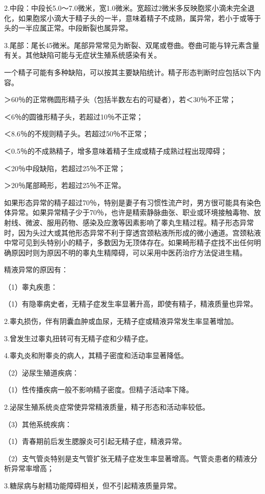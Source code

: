 \documentclass[12pt,UTF8,openany]{ctexbook}
\begin{document}
2.中段：中段长5.0～7.0微米，宽1.0微米。宽超过2微米多反映胞浆小滴未完全退化，如果胞浆小滴大于精子头的一半，意味着精子不成熟，属异常，若小于或等于头的一半应属正常。中段断裂也属异常。

3.尾部：尾长45微米。尾部异常常见为断裂、双尾或卷曲。卷曲可能与锌元素含量有关。其他缺陷可能与无症状生殖系统感染有关。

一个精子可能有多种缺陷，可以按其主要缺陷统计。精子形态判断时应包括以下内容。

＞60％的正常椭圆形精子头（包括半数左右的可疑者），若＜30％不正常；

＜6％的圆锥形精子头，若超过10％不正常；

＜8.6％的不规则精子头。若超过50％不正常；

＜0.5％的不成熟精子，增多意味着精子生成或精子成熟过程出现障碍；

＜20％中段缺陷，若超过25％不正常；

＞20％尾部畸形，若超过25％不正常。

如果形态异常的精子超过70％，特别是妻子有习惯性流产时，男方很可能具有染色体异常。如果异常精子少于70％，也许是精索静脉曲张、职业或环境接触毒物、放射线、微波、服用药物、感染及应激等因素影响了睾丸生精过程。精子形态异常时，因为头过大或其他形态异常不利于穿透宫颈粘液所形成的微小通道。宫颈粘液中常可见到头特别小的精子，多数因为无顶体存在。如果畸形精子症找不出任何明确原因时则为原因不明的睾丸生精障碍，可以采用中医药治疗方法促进生精。

精液异常的原因有：

（1）睾丸疾患：

（1）有隐睾病史者，无精子症发生率显著升高，即使有精子，精液质量也异常。

2.睾丸损伤，伴有阴囊血肿或血尿，无精子症或精液异常发生率显著增加。

3.曾发生过睾丸扭转可有无精子症和少精子症。

4.睾丸炎和附睾炎的病人，其精子密度和活动率显著降低。

（2）泌尿生殖道疾病：

（1）性传播疾病一般不影响精子密度。但精子活动率下降。

2.泌尿生殖系统炎症常使异常精液质量，精子形态和活动率较低。

（3）其他系统疾病：

（1）青春期前后发生腮腺炎可引起无精子症，精液异常。

（2）支气管炎特别是支气管扩张无精子症发生率显著增高。气管炎患者的精液分析异常率增高；

3.糖尿病与射精功能障碍相关，但不引起精液质量异常。
\end{document}

